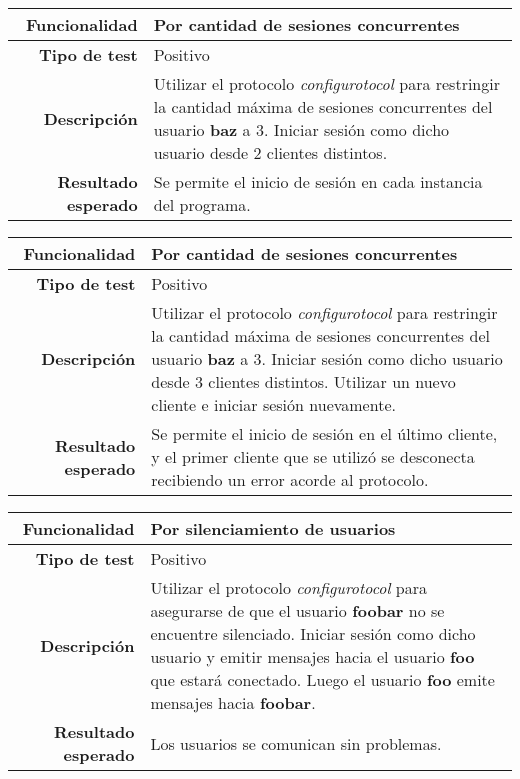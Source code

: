 \documentclass[a4paper,10pt]{article}
\begin{document}
\begin{center}
  \begin{tabular}{|r|p{12.5cm}|}
    \hline
    \textbf{Funcionalidad}	&	Por cantidad de sesiones concurrentes\\
    \hline
    \textbf{Tipo de test}	&	Positivo\\
    \hline
    \textbf{Descripción}	&	Utilizar el protocolo \textit{configurotocol} para restringir la cantidad
					máxima de sesiones concurrentes del usuario \textbf{baz} a 3.
					Iniciar sesión como dicho usuario desde 2 clientes distintos.\\
    \hline
    \textbf{Resultado esperado}	&	Se permite el inicio de sesión en cada instancia del programa.\\
    \hline   
  \end{tabular}
\end{center}

\begin{center}
  \begin{tabular}{|r|p{12.5cm}|}
    \hline
    \textbf{Funcionalidad}	&	Por cantidad de sesiones concurrentes\\
    \hline
    \textbf{Tipo de test}	&	Positivo\\
    \hline
    \textbf{Descripción}	&	Utilizar el protocolo \textit{configurotocol} para restringir la cantidad
					máxima de sesiones concurrentes del usuario \textbf{baz} a 3.
					Iniciar sesión como dicho usuario desde 3 clientes
					distintos. Utilizar un nuevo cliente e iniciar sesión nuevamente.\\
    \hline
    \textbf{Resultado esperado}	&	Se permite el inicio de sesión en el último cliente, y el primer cliente
					que se utilizó se desconecta recibiendo un error acorde al protocolo.\\
    \hline   
  \end{tabular}
\end{center}

\begin{center}
  \begin{tabular}{|r|p{12.5cm}|}
    \hline
    \textbf{Funcionalidad}	&	Por silenciamiento de usuarios\\
    \hline
    \textbf{Tipo de test}	&	Positivo\\
    \hline
    \textbf{Descripción}	&	Utilizar el protocolo \textit{configurotocol} para asegurarse de que el usuario
					\textbf{foobar} no se encuentre silenciado. Iniciar sesión como dicho
					usuario y emitir mensajes hacia el usuario \textbf{foo} que estará conectado.
					Luego el usuario \textbf{foo} emite mensajes hacia \textbf{foobar}.\\
    \hline
    \textbf{Resultado esperado}	&	Los usuarios se comunican sin problemas.\\
    \hline   
  \end{tabular}
\end{center}
\end{document}
